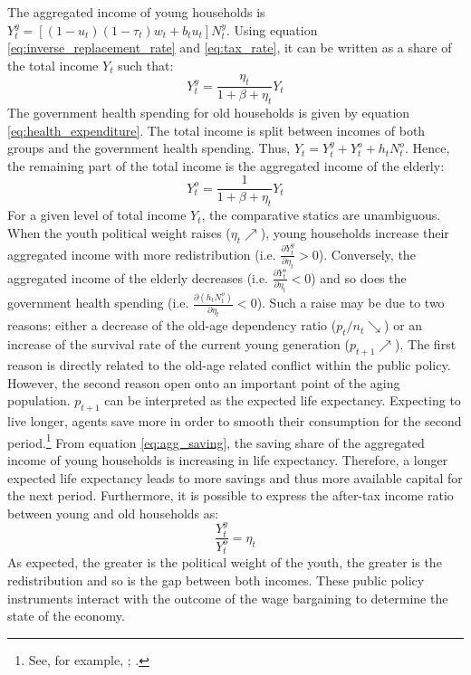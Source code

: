 The aggregated income of young households is $Y_t^y = \left[(1-u_t)(1-\tau_t)w_t+b_tu_t\right]N_t^y$. Using equation \eqref{eq:inverse_replacement_rate} and \eqref{eq:tax_rate}, it can be written as a share of the total income $Y_t$ such that:
\begin{equation*}
Y_t^y = \frac{\eta_t}{1+\beta+\eta_t} Y_t
\end{equation*}
The government health spending for old households is given by equation \eqref{eq:health_expenditure}. The total income is split between incomes of both groups and the government health spending. Thus, $Y_t = Y_t^y + Y_t^o + h_tN_t^o$. Hence, the remaining part of the total income is the aggregated income of the elderly:
\begin{equation*}
Y_t^o = \frac{1}{1+\beta+\eta_t} Y_t
\end{equation*}
For a given level of total income $Y_t$, the comparative statics are unambiguous. When the youth political weight raises ($\eta_t \nearrow$), young households increase their aggregated income with more redistribution (i.e. $\frac{\partial Y_t^y}{\partial \eta_t}>0$). Conversely, the aggregated income of the elderly decreases (i.e. $\frac{\partial Y_t^o}{\partial \eta_t}<0$) and so does the government health spending (i.e. $\frac{\partial(h_tN_t^o)}{\partial \eta_t}<0$). Such a raise may be due to two reasons: either a decrease of the old-age dependency ratio ($p_t/n_t \searrow$) or an increase of the survival rate of the current young generation ($p_{t+1} \nearrow$). The first reason is directly related to the old-age related conflict within the public policy. However, the second reason open onto an important point of the aging population. $p_{t+1}$ can be interpreted as the expected life expectancy. Expecting to live longer, agents save more in order to smooth their consumption for the second period.\footnote{See, for example, \cite{Bloom2003}; \cite{Zhang2005}.} From equation \eqref{eq:agg_saving}, the saving share of the aggregated income of young households is increasing in life expectancy. Therefore, a longer expected life expectancy leads to more savings and thus more available capital for the next period. Furthermore, it is possible to express the after-tax income ratio between young and old households as:
\begin{equation} \label{eq:after_tax_income_ratio}
	\frac{Y_t^y}{Y_t^o} = \eta_t
\end{equation}
As expected, the greater is the political weight of the youth, the greater is the redistribution and so is the gap between both incomes.
These public policy instruments interact with the outcome of the wage bargaining to determine the state of the economy.

